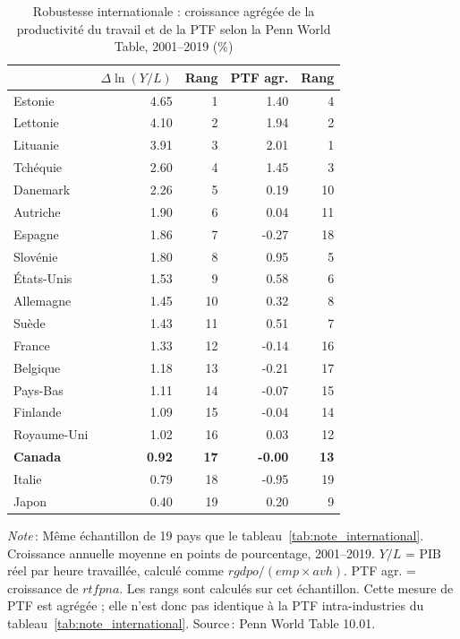 \begin{table}[H]
\centering
\sffamily
\small
\renewcommand{\arraystretch}{1.15}
\begin{threeparttable}
\caption{Robustesse internationale : croissance agrégée de la productivité du travail et de la PTF selon la Penn World Table, 2001--2019 (\%)}
\label{tab:note_pwt_robustness}
\begin{tabular}{l *{4}{r}}
\toprule
& $\Delta \ln(Y/L)$ & Rang & PTF agr. & Rang \\
\midrule
Estonie & 4.65 & 1 & 1.40 & 4 \\
Lettonie & 4.10 & 2 & 1.94 & 2 \\
Lituanie & 3.91 & 3 & 2.01 & 1 \\
Tchéquie & 2.60 & 4 & 1.45 & 3 \\
Danemark & 2.26 & 5 & 0.19 & 10 \\
Autriche & 1.90 & 6 & 0.04 & 11 \\
Espagne & 1.86 & 7 & -0.27 & 18 \\
Slovénie & 1.80 & 8 & 0.95 & 5 \\
États-Unis & 1.53 & 9 & 0.58 & 6 \\
Allemagne & 1.45 & 10 & 0.32 & 8 \\
Suède & 1.43 & 11 & 0.51 & 7 \\
France & 1.33 & 12 & -0.14 & 16 \\
Belgique & 1.18 & 13 & -0.21 & 17 \\
Pays-Bas & 1.11 & 14 & -0.07 & 15 \\
Finlande & 1.09 & 15 & -0.04 & 14 \\
Royaume-Uni & 1.02 & 16 & 0.03 & 12 \\
\textbf{Canada} & \textbf{0.92} & \textbf{17} & \textbf{-0.00} & \textbf{13} \\
Italie & 0.79 & 18 & -0.95 & 19 \\
Japon & 0.40 & 19 & 0.20 & 9 \\
\bottomrule
\end{tabular}
\begin{tablenotes}\footnotesize
\item \textit{Note}\,: Même échantillon de 19 pays que le tableau~\ref{tab:note_international}. Croissance annuelle moyenne en points de pourcentage, 2001--2019. $Y/L$ = PIB réel par heure travaillée, calculé comme $rgdpo/(emp \times avh)$. PTF agr. = croissance de $rtfpna$. Les rangs sont calculés sur cet échantillon. Cette mesure de PTF est agrégée ; elle n'est donc pas identique à la PTF intra-industries du tableau~\ref{tab:note_international}. Source\,: Penn World Table 10.01.
\end{tablenotes}
\end{threeparttable}
\end{table}